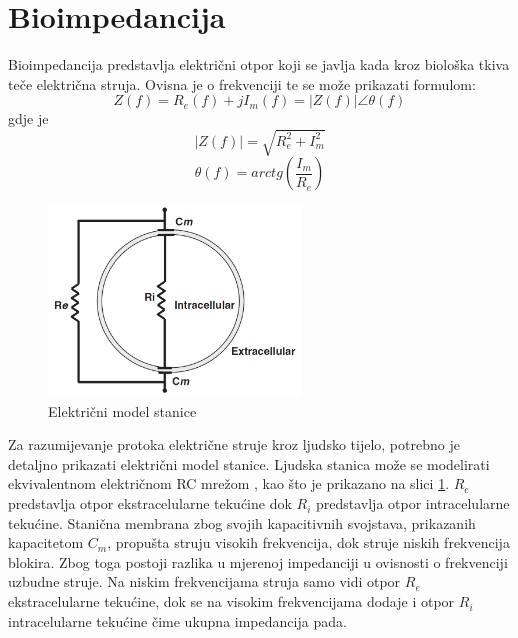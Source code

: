 \documentclass[../diplomski_rad.tex]{subfiles}
\begin{document}
\sloppy

\justifying

\section{Bioimpedancija}

Bioimpedancija predstavlja električni otpor koji se javlja kada kroz biološka tkiva teče električna struja.
Ovisna je o frekvenciji te se može prikazati formulom:
\begin{equation}
    \label{jed:cpe}
    Z(f) = R_{e}(f) + jI_{m}(f) = |Z(f)|\angle\theta(f) 
\end{equation}
gdje je
\begin{equation}
    \label{jed:cpe}
    |Z(f)| = \sqrt{R_{e}^{2} + I_{m}^{2}}
\end{equation} 
\begin{equation}
    \label{jed:cpe}
    \theta(f) = arctg(\frac{I_{m}}{R_{e}})
\end{equation} 

\begin{figure}[htb]
    \centering
    \includegraphics[width=0.6\textwidth]{Figures/stanica.png} 
    \caption{Električni model stanice \cite{Lukaski2013}}
    \label{slk:stanica}
\end{figure}
Za razumijevanje protoka električne struje kroz ljudsko tijelo, potrebno je detaljno prikazati električni model stanice.
Ljudska stanica može se modelirati ekvivalentnom električnom RC mrežom \cite{Lukaski2013}, 
kao što je prikazano na slici \ref{slk:stanica}. 
$R_{e}$ predstavlja otpor ekstracelularne tekućine dok $R_{i}$ predstavlja otpor intracelularne tekućine.
Stanična membrana zbog svojih kapacitivnih svojstava, prikazanih kapacitetom $C_{m}$, 
propušta struju visokih frekvencija, dok struje niskih frekvencija blokira. 
Zbog toga postoji razlika u mjerenoj impedanciji u ovisnosti o frekvenciji uzbudne struje. 
Na niskim frekvencijama struja samo vidi otpor $R_{e}$ ekstracelularne tekućine, dok se na visokim frekvencijama dodaje i otpor 
$R_{i}$ intracelularne tekućine čime ukupna impedancija pada.
\end{document}
